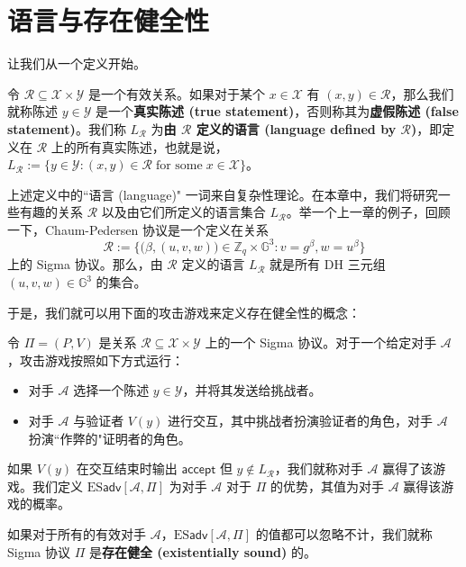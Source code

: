 \section{语言与存在健全性}\label{sec:20-1}

让我们从一个定义开始。

\begin{definition}[真实陈述的语言]
令 $\mathcal{R}\subseteq\mathcal{X}\times\mathcal{Y}$ 是一个有效关系。如果对于某个 $x\in\mathcal{X}$ 有 $(x,y)\in\mathcal{R}$，那么我们就称陈述 $y\in\mathcal{Y}$ 是一个\textbf{真实陈述 (true statement)}，否则称其为\textbf{虚假陈述 (false statement)}。我们称 $L_{\mathcal{R}}$ 为\textbf{由 $\mathcal{R}$ 定义的语言 (language defined by $\mathcal{R}$)}，即定义在 $\mathcal{R}$ 上的所有真实陈述，也就是说，$L_{\mathcal{R}}:=\{y\in\mathcal{Y}:(x,y)\in\mathcal{R}\;\text{for some}\;x\in\mathcal{X}\}$。
\end{definition}

上述定义中的``语言 (language)" 一词来自复杂性理论。在本章中，我们将研究一些有趣的关系 $\mathcal{R}$ 以及由它们所定义的语言集合 $L_{\mathcal{R}}$。举一个上一章的例子，回顾一下，Chaum-Pedersen 协议是一个定义在关系
\[
\mathcal{R}:=\bigg\lbrace
\big(\beta, (u,v,w)\big)\in\mathbb{Z}_q\times\mathbb{G}^3:v=g^\beta, w=u^\beta
\bigg\rbrace
\]
上的 Sigma 协议。那么，由 $\mathcal{R}$ 定义的语言 $L_{\mathcal{R}}$ 就是所有 DH 三元组 $(u,v,w)\in\mathbb{G}^3$ 的集合。

于是，我们就可以用下面的攻击游戏来定义存在健全性的概念：

\begin{game}[存在健全性]\label{game:20-1}
令 $\Pi=(P,V)$ 是关系 $\mathcal{R}\subseteq\mathcal{X}\times\mathcal{Y}$ 上的一个 Sigma 协议。对于一个给定对手 $\mathcal{A}$，攻击游戏按照如下方式运行：
\begin{itemize}
	\item 对手 $\mathcal{A}$ 选择一个陈述 $y\in\mathcal{Y}$，并将其发送给挑战者。
	\item 对手 $\mathcal{A}$ 与验证者 $V(y)$ 进行交互，其中挑战者扮演验证者的角色，对手 $\mathcal{A}$ 扮演``作弊的"证明者的角色。
\end{itemize}
如果 $V(y)$ 在交互结束时输出 $\mathsf{accept}$ 但 $y\notin L_{\mathcal{R}}$，我们就称对手 $\mathcal{A}$ 赢得了该游戏。我们定义 $\mathrm{ES}\mathsf{adv}[\mathcal{A},{\Pi}]$ 为对手 $\mathcal{A}$ 对于 $\Pi$ 的优势，其值为对手 $\mathcal{A}$ 赢得该游戏的概率。
\end{game}

\begin{definition}
如果对于所有的有效对手 $\mathcal{A}$，$\mathrm{ES}\mathsf{adv}[\mathcal{A},{\Pi}]$ 的值都可以忽略不计，我们就称 Sigma 协议 $\Pi$ 是\textbf{存在健全 (existentially sound)} 的。
\end{definition}

